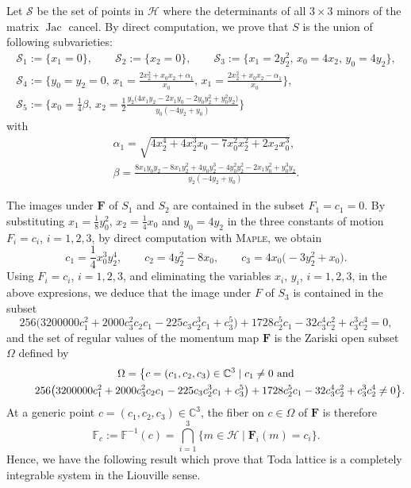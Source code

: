 \documentclass[pdftex]{sigma}
\numberwithin{equation}{section}
\begin{document}
Let $\mathcal{S}$ be the set of points in $\mathcal{H}$ where the
determinants of all $3 \times 3$ minors of the matrix $\operatorname{Jac}$ cancel.
By direct computation, we prove that $S$ is the union of following
subvarieties:
\begin{gather*}
\mathcal{S}_1:= \{x_1=0\},\qquad \mathcal{S}_2:= \{x_2=0\},\qquad \mathcal{S}_3:=\big\{x_1=2y_2^2,\,x_0=4x_2,\,y_0=4y_2\big\},\\
\mathcal{S}_4:= \biggl\{y_0=y_2=0,\,x_1=\frac{2x_2^2+x_0x_2+ \alpha_1}{x_0},\,x_1=\frac{2x_2^2+x_0x_2-\alpha_1}{x_0}\biggr\},\\
\mathcal{S}_5:= \biggl\{x_0=\frac{1}{4}\beta,\, x_2=\frac{1}{2}\frac{y_2\bigl(4x_1y_2-2x_1y_0-2y_0y_2^2+y_0^2y_2\bigr)}{y_0(-4y_2+y_0)}\biggr\}
\end{gather*}
 with
\begin{gather*}
\alpha_1=\sqrt{4x_2^4+4x_2^3x_0-7x_0^2x_2^2+2x_2x_0^3},\\
\beta=\frac{8x_1y_0y_2-8x_1y_2^2+4y_0y_2^3-4y_0^2y_2^2-2x_1y_0^2+y_0^3y_2}{y_2(-4y_2+ y_0 )}.
\end{gather*}

 The images under $\mathbf{F}$ of $S_1$ and $S_2$ are contained in the subset $ F_1=c_1=0.$
 By substituting $x_1=\frac{1}{8}y_0^2$, $x_2=\frac{1}{4}x_0$ and $y_0=4y_2$ in the three constants
of motion $F_i=c_i$, $i=1,2,3$, by direct computation
with \textsc{Maple}, we obtain
\[
 c_1=\dfrac{1}{4}x_0^3y_2^4, \qquad
 c_2=4y_2^2-8x_0, \qquad
 c_3=4x_0\bigl(-3y_2^2+x_0\bigr).
\]
Using $F_i=c_i$, $i=1,2,3$, and eliminating the variables
$x_i$, $y_i$, $i=1,2,3$, in the above expresions, we deduce that
the image under $F$ of $S_3$ is contained in the subset
\[256\bigl(3200000c_1^2+2000c_3^2c_2c_1-225c_3c_2^3c_1
+c_3^5\bigr)+1728c_2^5c_1 -32c_3^4c_2^2+c_3^3c_2^4=0,\] and the set
of regular values of the momentum map $\mathbf{F}$ is the Zariski
open subset $\Omega$ defined by
\begin{gather*}
 \Omega = \big\{c=(c_1,c_2,c_3) \in \mathbb{C}^3 \mid c_1\neq 0 \ \text{and} \\ \hphantom{\Omega = \big\{}{}
 256\bigl(3200000c_1^2+2000c_3 ^2c_2c_1-225c_3c_2^3c_1+c_3^5\bigr)+1728c_2^5c_1-32c_3^4c_2^2+c_3^3c_2^4\neq 0\big\}.
\end{gather*}
At a generic point $c=(c_1,c_2,c_3) \in \mathbb{C}^3$,
the fiber on $c\in \Omega$ of $\mathbf{F }$ is therefore
\[\mathbb{F}_c:= \mathbb{F}^{-1}(c)=\bigcap_{i=1}^3
\{m\in \mathcal{H}\mid \mathbf{F}_i(m)=c_i\}.\]
Hence, we have the following result which prove that
 Toda lattice is a completely integrable
system in the Liouville sense.
\end{document}
